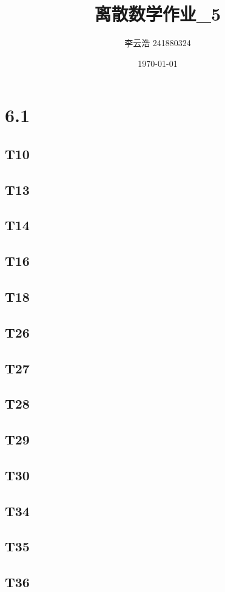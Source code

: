 \documentclass{article}
\title{离散数学作业\_5}
\author{李云浩 241880324}
\date{\today}
\begin{document}
\maketitle
\section{6.1}
\subsection{T10}
\subsection{T13}
\subsection{T14}
\subsection{T16}
\subsection{T18}
\subsection{T26}
\subsection{T27}
\subsection{T28}
\subsection{T29}
\subsection{T30}
\subsection{T34}
\subsection{T35}
\subsection{T36}
\end{document}
